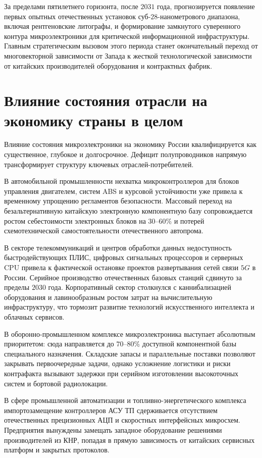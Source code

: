 \documentclass[12pt,a4paper]{article}
\begin{document}
За пределами пятилетнего горизонта, после $2031$ года, прогнозируется 
появление первых опытных отечественных установок суб-$28$-нанометрового 
диапазона, включая рентгеновские литографы, и формирование замкнутого 
суверенного контура микроэлектроники для критической информационной 
инфраструктуры. Главным стратегическим вызовом этого периода станет 
окончательный переход от многовекторной зависимости от Запада к жесткой 
технологической зависимости от китайских производителей оборудования и 
контрактных фабрик.

\section{Влияние состояния отрасли на экономику страны в целом}

Влияние состояния микроэлектроники на экономику России квалифицируется 
как существенное, глубокое и долгосрочное. Дефицит полупроводников 
напрямую трансформирует структуру ключевых отраслей-потребителей.

В автомобильной промышленности нехватка микроконтроллеров для блоков 
управления двигателем, систем ABS и курсовой устойчивости уже привела к 
временному упрощению регламентов безопасности. Массовый переход на 
безальтернативную китайскую электронную компонентную базу 
сопровождается ростом себестоимости электронных блоков на $30$--$60$\% и 
потерей схемотехнической самостоятельности отечественного автопрома.

В секторе телекоммуникаций и центров обработки данных недоступность 
быстродействующих ПЛИС, цифровых сигнальных процессоров и серверных 
CPU привела к фактической остановке проектов развертывания сетей связи 
$5G$ в России. Серийное производство отечественных базовых станций 
сдвинуто за пределы $2030$ года. Корпоративный сектор столкнулся с 
каннибализацией оборудования и лавинообразным ростом затрат на 
вычислительную инфраструктуру, что тормозит развитие технологий 
искусственного интеллекта и облачных сервисов.

В оборонно-промышленном комплексе микроэлектроника выступает абсолютным 
приоритетом: сюда направляется до $70$--$80$\% доступной компонентной базы 
специального назначения. Складские запасы и параллельные поставки 
позволяют закрывать первоочередные задачи, однако усложнение логистики 
и риски контрафакта вызывают задержки при серийном изготовлении 
высокоточных систем и бортовой радиолокации.

В сфере промышленной автоматизации и топливно-энергетического комплекса 
импортозамещение контроллеров АСУ ТП сдерживается отсутствием 
отечественных прецизионных АЦП и скоростных интерфейсных микросхем. 
Предприятия вынуждены замещать западное оборудование решениями 
производителей из КНР, попадая в прямую зависимость от китайских 
сервисных платформ и закрытых протоколов.
\end{document}
